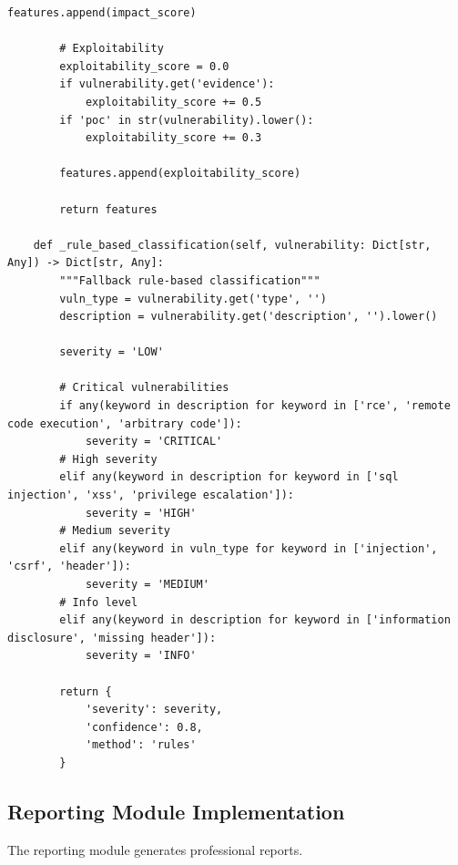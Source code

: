 \documentclass[12pt,a4paper]{report}
\begin{document}
\begin{lstlisting}[caption=AI Engine Implementation]
        features.append(impact_score)
        
        # Exploitability
        exploitability_score = 0.0
        if vulnerability.get('evidence'):
            exploitability_score += 0.5
        if 'poc' in str(vulnerability).lower():
            exploitability_score += 0.3
            
        features.append(exploitability_score)
        
        return features
    
    def _rule_based_classification(self, vulnerability: Dict[str, Any]) -> Dict[str, Any]:
        """Fallback rule-based classification"""
        vuln_type = vulnerability.get('type', '')
        description = vulnerability.get('description', '').lower()
        
        severity = 'LOW'
        
        # Critical vulnerabilities
        if any(keyword in description for keyword in ['rce', 'remote code execution', 'arbitrary code']):
            severity = 'CRITICAL'
        # High severity
        elif any(keyword in description for keyword in ['sql injection', 'xss', 'privilege escalation']):
            severity = 'HIGH'
        # Medium severity
        elif any(keyword in vuln_type for keyword in ['injection', 'csrf', 'header']):
            severity = 'MEDIUM'
        # Info level
        elif any(keyword in description for keyword in ['information disclosure', 'missing header']):
            severity = 'INFO'
            
        return {
            'severity': severity,
            'confidence': 0.8,
            'method': 'rules'
        }
\end{lstlisting}

\subsection{Reporting Module Implementation}

The reporting module generates professional reports.
\end{document}

